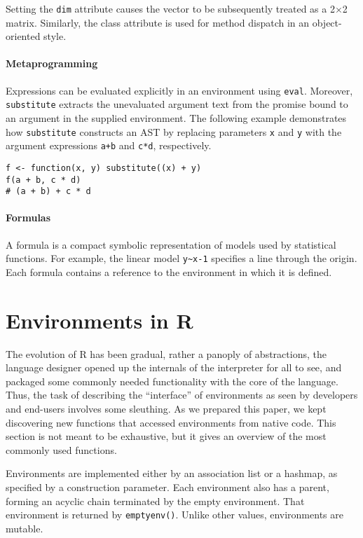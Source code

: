 \documentclass[10pt,sigplan,authorversion=true]{acmart}
\renewcommand{\c}[1]{\lstinline |#1|\xspace}
\newcommand{\eval}{\c{eval}}
\newcommand{\substitute}{\c{substitute}}
\begin{document}
\noindent
Setting the \c{dim} attribute causes the vector to be subsequently treated as
a 2$\times$2 matrix. Similarly, the class attribute is used for method dispatch
in an object-oriented style.

\paragraph{Metaprogramming}

Expressions can be evaluated explicitly in an
environment using \eval. Moreover, \substitute extracts the unevaluated argument
text from the promise bound to an argument in the supplied environment. The
following example demonstrates how \substitute constructs an AST by replacing
parameters \c{x} and \c{y} with the argument expressions \c{a+b} and \c{c*d},
respectively.

\begin{lstlisting}
f <- function(x, y) substitute((x) + y)
f(a + b, c * d)
# (a + b) + c * d
\end{lstlisting}


\paragraph{Formulas}  A formula is a compact symbolic representation of models
used by statistical functions. For example, the linear model \c{y~x-1}
specifies a line through the origin. Each formula contains a reference to the
environment in which it is defined.

\newpage
\section{Environments in R}

The evolution of R has been gradual, rather a panoply of abstractions, the
language designer opened up the internals of the interpreter for all to see, and
packaged some commonly needed functionality with the core of the language. Thus,
the task of describing the ``interface'' of environments as seen by developers
and end-users involves some sleuthing. As we prepared this paper, we kept
discovering new functions that accessed environments from native code. This
section is not meant to be exhaustive, but it gives an overview of the most
commonly used functions.

Environments are implemented either by an association list or a hashmap, as
specified by a construction parameter. Each environment also has a parent,
forming an acyclic chain terminated by the empty environment. That environment
is returned by \c{emptyenv()}. Unlike other values, environments are mutable.
\end{document}
